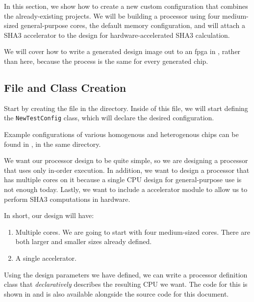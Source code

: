 In this section, we show how to create a new custom configuration that combines the already-existing projects.
We will be building a processor using four medium-sized  general-purpose cores, the default memory configuration, and will attach a SHA3 accelerator to the design for hardware-accelerated SHA3 calculation.

We will cover how to write a generated design image out to an \gls{fpga} in , rather than here, because the process is the same for every generated chip.

\subsection{File and Class Creation}\label{sec:Custom_Config-File_Class}
Start by creating the  file in the  directory.
Inside of this file, we will start defining the \texttt{NewTestConfig} class, which will declare the desired configuration.

\begin{blackbox}
  Example configurations of various homogenous and heterogenous chips can be found in , in the same directory.
\end{blackbox}

We want our processor design to be quite simple, so we are designing a processor that uses only in-order execution.
In addition, we want to design a processor that has multiple cores on it because a single CPU design for general-purpose use is not enough today.
Lastly, we want to include a  accelerator module to allow us to perform SHA3 computations in hardware.

In short, our design will have:
\begin{enumerate}
\item Multiple  cores.
  We are going to start with four medium-sized cores.
  There are both larger and smaller sizes already defined.
\item A single  accelerator.
\end{enumerate}

Using the design parameters we have defined, we can write a processor definition class that \emph{declaratively} describes the resulting CPU we want.
The code for this is shown in  and is also available alongside the source code for this document.

